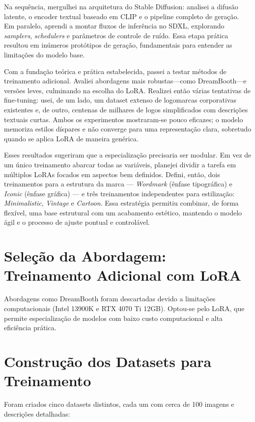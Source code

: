 \documentclass[12pt, %
openright, 
oneside, %
a4paper,    %
brazil]{facom-ufu-abntex2}
\begin{document}
Na sequência, mergulhei na arquitetura do Stable Diffusion: analisei a difusão latente, o encoder textual baseado em CLIP e o pipeline completo de geração. Em paralelo, aprendi a montar fluxos de inferência no SDXL, explorando \emph{samplers}, \emph{schedulers} e parâmetros de controle de ruído. Essa etapa prática resultou em inúmeros protótipos de geração, fundamentais para entender as limitações do modelo base.

Com a fundação teórica e prática estabelecida, passei a testar métodos de treinamento adicional. Avaliei abordagens mais robustas—como DreamBooth—e versões leves, culminando na escolha do LoRA. Realizei então várias tentativas de fine-tuning: usei, de um lado, um dataset extenso de logomarcas corporativas existentes e, de outro, centenas de milhares de logos simplificados com descrições textuais curtas. Ambos os experimentos mostraram-se pouco eficazes; o modelo memoriza estilos díspares e não converge para uma representação clara, sobretudo quando se aplica LoRA de maneira genérica.

Esses resultados sugeriram que a especialização precisaria ser modular. Em vez de um único treinamento abarcar todas as variáveis, planejei dividir a tarefa em múltiplos LoRAs focados em aspectos bem definidos. Defini, então, dois treinamentos para a estrutura da marca — \emph{Wordmark} (ênfase tipográfica) e \emph{Iconic} (ênfase gráfica) — e três treinamentos independentes para estilização: \emph{Minimalistic}, \emph{Vintage} e \emph{Cartoon}. Essa estratégia permitiu combinar, de forma flexível, uma base estrutural com um acabamento estético, mantendo o modelo ágil e o processo de ajuste pontual e controlável.

\section{Seleção da Abordagem: Treinamento Adicional com LoRA}

Abordagens como DreamBooth foram descartadas devido a limitações computacionais (Intel 13900K e RTX 4070 Ti 12GB). Optou-se pelo LoRA, que permite especialização de modelos com baixo custo computacional e alta eficiência prática.

\section{Construção dos Datasets para Treinamento}

Foram criados cinco datasets distintos, cada um com cerca de 100 imagens e descrições detalhadas:
\end{document}
